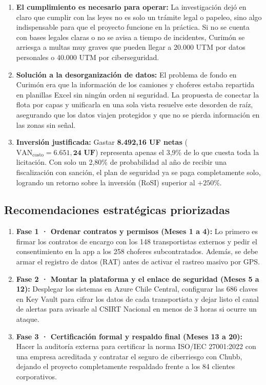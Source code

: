 \begin{enumerate}
\def\labelenumi{\arabic{enumi}.}
\tightlist
\item
  \textbf{El cumplimiento es necesario para operar:} La investigación dejó en claro que cumplir con las leyes no es solo un trámite legal o papeleo, sino algo indispensable para que el proyecto funcione en la práctica. Si no se cuenta con bases legales claras o no se avisa a tiempo de incidentes, Curimón se arriesga a multas muy graves que pueden llegar a 20.000 UTM por datos personales o 40.000 UTM por ciberseguridad.
\item
  \textbf{Solución a la desorganización de datos:} El problema de fondo en Curimón era que la información de los camiones y choferes estaba repartida en planillas Excel sin ningún orden ni seguridad. La propuesta de conectar la flota por capas y unificarla en una sola vista resuelve este desorden de raíz, asegurando que los datos viajen protegidos y que no se pierda información en las zonas sin señal.
\item
  \textbf{Inversión justificada:} Gastar \textbf{8.492,16 UF netas} (\(\text{VAN}_{\text{costo}} = \mathbf{6.651,24\text{ UF}}\)) representa apenas el 3,9\% de lo que cuesta toda la licitación. Con solo un 2,80\% de probabilidad al año de recibir una fiscalización con sanción, el plan de seguridad ya se paga completamente solo, logrando un retorno sobre la inversión (RoSI) superior al \(+250\%\).
\end{enumerate}

\subsection{Recomendaciones estratégicas priorizadas}\label{recomendaciones-estratuxe9gicas-priorizadas}

\begin{enumerate}
\def\labelenumi{\arabic{enumi}.}
\tightlist
\item
  \textbf{Fase 1 · Ordenar contratos y permisos (Meses 1 a 4):} Lo primero es firmar los contratos de encargo con los 148 transportistas externos y pedir el consentimiento en la app a los 258 choferes subcontratados. Además, se debe armar el registro de datos (RAT) antes de activar el rastreo masivo por GPS.
\item
  \textbf{Fase 2 · Montar la plataforma y el enlace de seguridad (Meses 5 a 12):} Desplegar los sistemas en Azure Chile Central, configurar las 686 claves en Key Vault para cifrar los datos de cada transportista y dejar listo el canal de alertas para avisarle al CSIRT Nacional en menos de 3 horas si ocurre un ataque.
\item
  \textbf{Fase 3 · Certificación formal y respaldo final (Meses 13 a 20):} Hacer la auditoría externa para certificar la norma ISO/IEC 27001:2022 con una empresa acreditada y contratar el seguro de ciberriesgo con Chubb, dejando el proyecto completamente respaldado frente a los 84 clientes corporativos.
\end{enumerate}
